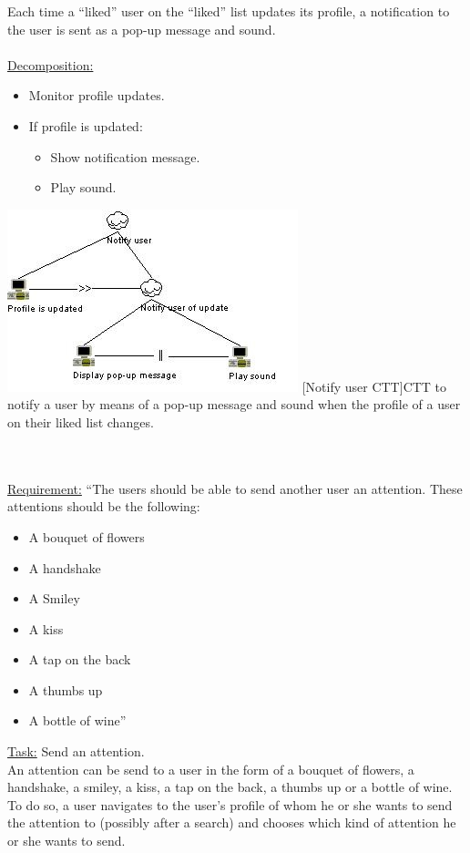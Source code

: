 \documentclass[11pt, a4paper,svglistings,oneside]{book}
\begin{document}
Each time a ``liked'' user on the ``liked'' list updates its profile, a notification to the user is sent as a pop-up message and sound.\\ \\
\underline{Decomposition:}
\begin{itemize}
\item Monitor profile updates.
\item If profile is updated:
\begin{itemize}
\item Show notification message.
\item Play sound.
\end{itemize}
\end{itemize}
\noindent\begin{minipage}{\textwidth}
    \centering
   \includegraphics[scale=1.2]{CTT_Notify.png}
 [Notify user CTT]{CTT to notify a user by means of a pop-up message and sound when the profile of a user on their liked list changes.}
\end{minipage}
$\;$ \\ \\
\underline{Requirement:} ``The users should be able to send another user an attention. These attentions should be the following:
\begin{itemize}
\item A bouquet of flowers
\item A handshake
\item A Smiley
\item A kiss
\item A tap on the back	
\item A thumbs up	
\item A bottle of wine''
\end{itemize}
\underline{Task:} Send an attention. \\
An attention can be send to a user in the form of a bouquet of flowers, a handshake, a smiley, a kiss, a tap on the back, a thumbs up or a bottle of wine. To do so, a user navigates to the user's profile of whom he or she wants to send the attention to (possibly after a search) and chooses which kind of attention he or she wants to send. \\ \\
\end{document}
